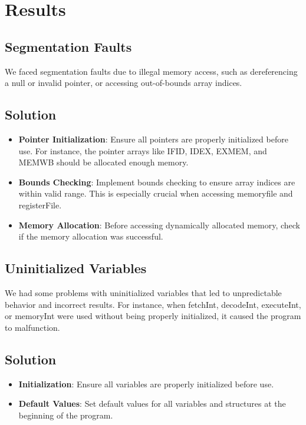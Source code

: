 \documentclass{article}
\begin{document}
\section{Results}

\subsection{Segmentation Faults}

We faced segmentation faults due to illegal memory access, such as dereferencing a null or invalid pointer, or accessing out-of-bounds array indices.

\subsection{Solution}
\begin{itemize}
    \item \textbf{Pointer Initialization}: Ensure all pointers are properly initialized before use. For instance, the pointer arrays like IFID, IDEX, EXMEM, and MEMWB should be allocated enough memory.
    \item \textbf{Bounds Checking}: Implement bounds checking to ensure array indices are within valid range. This is especially crucial when accessing memoryfile and registerFile.
    \item \textbf{Memory Allocation}: Before accessing dynamically allocated memory, check if the memory allocation was successful.

\end{itemize}

\subsection{Uninitialized Variables}

We had some problems with uninitialized variables that led to unpredictable behavior and incorrect results. For instance, when fetchInt, decodeInt, executeInt, or memoryInt were used without being properly initialized, it caused the program to malfunction.

\subsection{Solution}
\begin{itemize}
    \item \textbf{Initialization}: Ensure all variables are properly initialized before use.
    \item \textbf{Default Values}: Set default values for all variables and structures at the beginning of the program.
\end{itemize}
\end{document}
